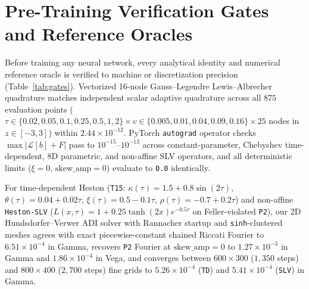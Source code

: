 \documentclass[preprint,12pt]{elsarticle}
\begin{document}
\section{Pre-Training Verification Gates and Reference Oracles}
\label{sec:gates}

Before training any neural network, every analytical identity and numerical reference oracle is verified to machine or discretization precision (Table~\ref{tab:gates}). Vectorized 16-node Gauss--Legendre Lewis--Albrecher quadrature matches independent scalar adaptive quadrature across all $875$ evaluation points ($\tau \in \{0.02, 0.05, 0.1, 0.25, 0.5, 1, 2\} \times v \in \{0.005, 0.01, 0.04, 0.09, 0.16\} \times 25$ nodes in $z \in [-3, 3]$) within $2.44 \times 10^{-12}$. PyTorch \texttt{autograd} operator checks $\max|\mathcal{L}[b] + F|$ pass to $10^{-15}\text{--}10^{-13}$ across constant-parameter, Chebyshev time-dependent, 8D parametric, and non-affine SLV operators, and all deterministic limits ($\xi = 0$, $\mathrm{skew\_amp} = 0$) evaluate to \texttt{0.0} identically.

For time-dependent Heston (\texttt{T15}: $\kappa(\tau) = 1.5 + 0.8\sin(2\tau)$, $\theta(\tau) = 0.04 + 0.02\tau$, $\xi(\tau) = 0.5 - 0.1\tau$, $\rho(\tau) = -0.7 + 0.2\tau$) and non-affine \texttt{Heston-SLV} ($L(x,\tau) = 1 + 0.25\tanh(2x)e^{-0.5\tau}$ on Feller-violated \texttt{P2}), our 2D Hundsdorfer--Verwer ADI solver with Rannacher startup and \texttt{sinh}-clustered meshes agrees with exact piecewise-constant chained Riccati Fourier to $6.51 \times 10^{-4}$ in Gamma, recovers \texttt{P2} Fourier at $\mathrm{skew\_amp}=0$ to $1.27 \times 10^{-3}$ in Gamma and $1.86 \times 10^{-4}$ in Vega, and converges between $600\times 300$ ($1{,}350$ steps) and $800\times 400$ ($2{,}700$ steps) fine grids to $5.26 \times 10^{-4}$ (\texttt{TD}) and $5.41 \times 10^{-4}$ (\texttt{SLV}) in Gamma.
\end{document}
